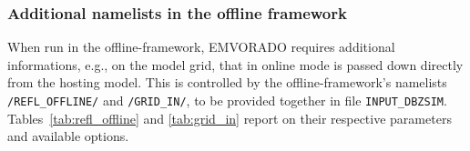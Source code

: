 \documentclass[10pt,a4paper,twoside,headinclude,footinclude,parskip=half]{scrartcl}
\newcommand{\myaktuellesection}{sec:intro}%
\newcommand{\labelsec}[1]{\label{#1}\renewcommand{\myaktuellesection}{#1}}%
\newcommand{\labelsec}[1]{\label{#1}}%
\newcommand{\srcform}[1]{\mbox{\texttt{#1}}\xspace}%
\newlength{\lenspeins}%
\newlength{\lenspzwei}%
\newlength{\lenspdrei}%
\newlength{\lenspvier}%
\newlength{\lenspfunf}%
\begin{document}
\newpage

\subsubsection{Additional namelists in the offline framework}
\labelsec{sec:nml:offline}

When run in the offline-framework, EMVORADO requires additional informations, e.g., on the model grid,
that in online mode is passed down directly from the hosting model. This is controlled by the offline-framework's
namelists \srcform{/REFL_OFFLINE/} and \srcform{/GRID_IN/}, to be provided together in file \srcform{INPUT_DBZSIM}.
Tables~\ref{tab:refl_offline} and \ref{tab:grid_in} report on their respective parameters and available options.

\begin{small}
\setlength{\lenspeins}{0.02cm}   %
\setlength{\lenspzwei}{2.4cm}
\setlength{\lenspdrei}{2.0cm}
\setlength{\lenspvier}{8.0cm}
\setlength{\lenspfunf}{2.4cm}



\end{small}
\end{document}

